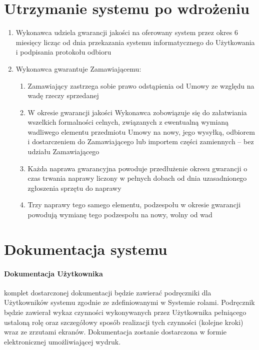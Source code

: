 \documentclass{article}
\begin{document}
\section{Utrzymanie systemu po wdrożeniu}
\begin{enumerate}
\item Wykonawca udziela gwarancji jakości na oferowany system przez okres 6 miesięcy licząc od dnia przekazania systemu informatycznego do Użytkowania i podpisania protokołu odbioru
\item Wykonawca  gwarantuje Zamawiającemu:
\begin{enumerate}
\item Zamawiający zastrzega sobie prawo odstąpienia od Umowy ze względu na wadę rzeczy sprzedanej
\item W okresie gwarancji jakości Wykonawca zobowiązuje się do załatwiania wszelkich formalności celnych, związanych z ewentualną wymianą wadliwego elementu przedmiotu Umowy na nowy, jego wysyłką, odbiorem i dostarczeniem do Zamawiającego lub importem części zamiennych – bez udziału Zamawiającego
\item Każda naprawa gwarancyjna powoduje przedłużenie okresu gwarancji o czas trwania naprawy liczony w pełnych dobach od dnia uzasadnionego zgłoszenia sprzętu do naprawy
\item Trzy naprawy tego samego elementu, podzespołu w okresie gwarancji powodują wymianę tego podzespołu na nowy, wolny od wad
\end{enumerate}
\end{enumerate}

\section{Dokumentacja systemu}
\paragraph{Dokumentacja Użytkownika} komplet dostarczonej dokumentacji będzie zawierać podręczniki dla Użytkowników systemu zgodnie ze zdefiniowanymi w Systemie rolami. Podręcznik będzie zawierał wykaz czynności wykonywanych przez Użytkownika pełniącego ustaloną rolę oraz szczegółowy sposób realizacji tych czynności (kolejne kroki) wraz ze zrzutami ekranów. Dokumentacja zostanie dostarczona w formie elektronicznej umożliwiającej wydruk.
\end{document}
